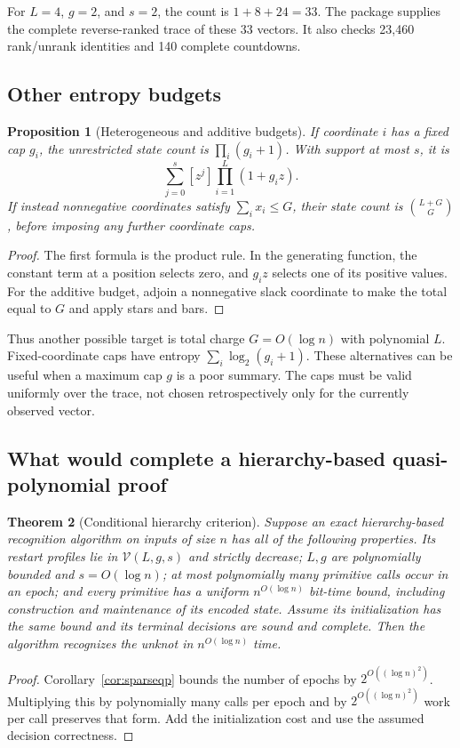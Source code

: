 \documentclass[11pt,letterpaper]{article}
\newtheorem{theorem}{Theorem}[section]
\newtheorem{proposition}[theorem]{Proposition}
\theoremstyle{definition}
\theoremstyle{remark}
\begin{document}
For $L=4$, $g=2$, and $s=2$, the count is $1+8+24=33$. The package supplies
the complete reverse-ranked trace of these 33 vectors. It also checks
23,460 rank/unrank identities and 140 complete countdowns.

\subsection{Other entropy budgets}
\begin{proposition}[Heterogeneous and additive budgets]
\label{prop:otherbudgets}
If coordinate $i$ has a fixed cap $g_i$, the unrestricted state count is
$\prod_i(g_i+1)$. With support at most $s$, it is
\[
 \sum_{j=0}^{s}[z^j]\prod_{i=1}^L(1+g_i z).
\]
If instead nonnegative coordinates satisfy $\sum_i x_i\leq G$, their
state count is $\binom{L+G}{G}$, before imposing any further coordinate caps.
\end{proposition}
\begin{proof}
The first formula is the product rule. In the generating function, the
constant term at a position selects zero, and $g_i z$ selects one of its
positive values. For the additive budget, adjoin a nonnegative slack
coordinate to make the total equal to $G$ and apply stars and bars.
\end{proof}

Thus another possible target is total charge $G=O(\log n)$ with polynomial
$L$. Fixed-coordinate caps have entropy $\sum_i\log_2(g_i+1)$.
These alternatives can be useful when a maximum cap $g$ is a poor summary.
The caps must be valid uniformly over the trace, not chosen retrospectively
only for the currently observed vector.

\subsection{What would complete a hierarchy-based quasi-polynomial proof}
\begin{theorem}[Conditional hierarchy criterion]
\label{thm:conditional}
Suppose an exact hierarchy-based recognition algorithm on inputs of size
$n$ has all of the following properties. Its restart profiles lie in
$\mathcal V(L,g,s)$ and strictly decrease; $L,g$ are polynomially bounded
and $s=O(\log n)$; at most polynomially many primitive calls occur in an
epoch; and every primitive has a uniform $n^{O(\log n)}$ bit-time bound,
including construction and maintenance of its encoded state. Assume its
initialization has the same bound and its terminal decisions are sound and
complete. Then the algorithm recognizes the unknot in $n^{O(\log n)}$ time.
\end{theorem}
\begin{proof}
Corollary~\ref{cor:sparseqp} bounds the number of epochs by
$2^{O((\log n)^2)}$. Multiplying this by polynomially many calls per epoch
and by $2^{O((\log n)^2)}$ work per call preserves that form. Add the
initialization cost and use the assumed decision correctness.
\end{proof}
\end{document}
